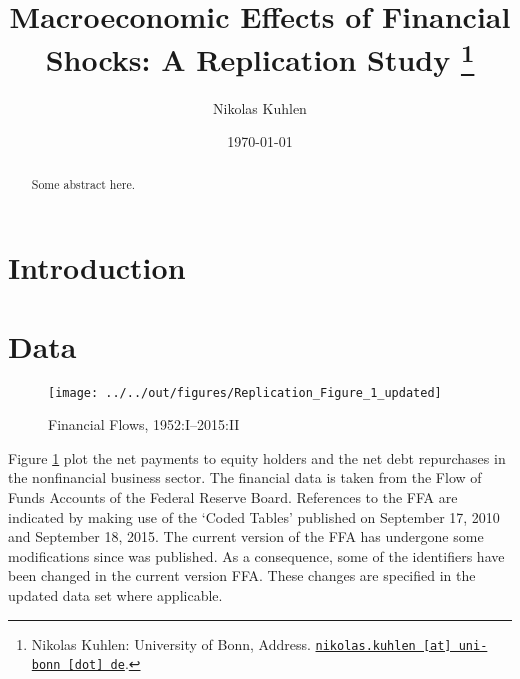 \documentclass[12pt,a4paper,leqno]{article}
\begin{document}
\title{Macroeconomic Effects of Financial Shocks: A Replication Study
\thanks{Nikolas Kuhlen: University of Bonn, Address. \href{mailto:nikolas.kuhlen@uni-bonn.de} {\nolinkurl{nikolas.kuhlen [at] uni-bonn [dot] de}}.}
}

\author{Nikolas Kuhlen
}

\date{\today}

\maketitle


\begin{abstract}
	Some abstract here.
\end{abstract}
\clearpage

\section{Introduction} %
\label{sec:introduction}

\section{Data} %
\label{sec:data}


\begin{figure}
    
    \texttt{[image: ../../out/figures/Replication\_Figure\_1\_updated]}

    \caption{Financial Flows, 1952:I--2015:II}

    \label{fig:figure_1}

\end{figure}


Figure \ref{fig:figure_1} plot the net payments to equity holders and the net debt repurchases in the nonfinancial business sector. The financial data is taken from the Flow of Funds Accounts of the Federal Reserve Board. References to the FFA are indicated by making use of the ‘Coded Tables’ published on September 17, 2010 and September 18, 2015. The current version of the FFA has undergone some modifications since \citet{JERMANNfinancial} was published. As a consequence, some of the identifiers have been changed in the current  version FFA. These changes are specified in the updated data set where applicable.
\end{document}
